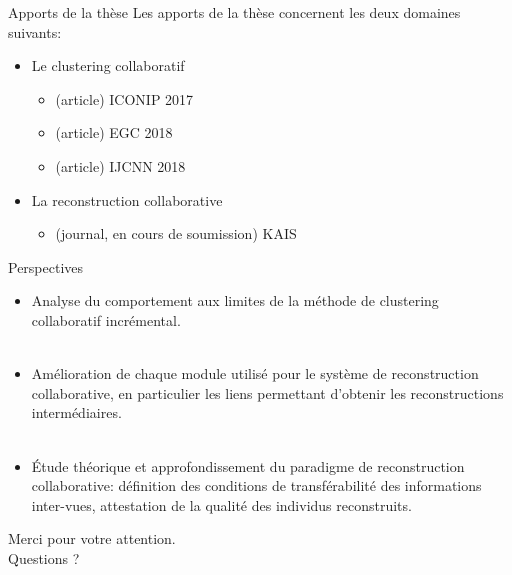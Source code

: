 \documentclass[hyperref={pdfpagelabels=false}]{beamer}
\begin{document}
    \begin{frame}{Apports de la thèse}
        Les apports de la thèse concernent les deux domaines suivants:
        \begin{itemize}
            \item Le clustering collaboratif
                \begin{itemize}
                    \item (article) ICONIP 2017
                    \item (article) EGC 2018
                    \item (article) IJCNN 2018
                \end{itemize}
            \item La reconstruction collaborative
                \begin{itemize}
                    \item (journal, en cours de soumission) KAIS
                \end{itemize}
        \end{itemize}
    \end{frame}

    \begin{frame}{Perspectives}
        \begin{itemize}
            \item Analyse du comportement aux limites de la méthode de 
                clustering collaboratif incrémental.\\~\\
            \item Amélioration de chaque module utilisé pour le système de 
                reconstruction collaborative, en particulier les liens 
                permettant d'obtenir les reconstructions intermédiaires.\\~\\
            \item Étude théorique et approfondissement du paradigme de 
                reconstruction collaborative: définition des conditions de 
                transférabilité des informations inter-vues, attestation de la 
                qualité des individus reconstruits.
        \end{itemize}
    \end{frame}

    \begin{frame}
        \begin{center}
            Merci pour votre attention.\\
            Questions ?
        \end{center}
    \end{frame}

\end{document}
